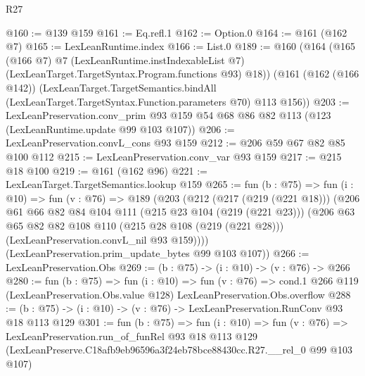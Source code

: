 \begin{lexlean}{R27}
\begin{coremodule}
@160 := @139 @159
@161 := Eq.refl.{1}
@162 := Option.{0}
@164 := @161 (@162 @7)
@165 := LexLeanRuntime.index
@166 := List.{0}
@189 := @160
    (@164
      (@165
        (@166 @7)
        @7
        (LexLeanRuntime.instIndexableList @7)
        (LexLeanTarget.TargetSyntax.Program.functions @93)
        @18))
    (@161
      (@162 (@166 @142))
      (LexLeanTarget.TargetSemantics.bindAll
        (LexLeanTarget.TargetSyntax.Function.parameters @70)
        @113
        @156))
@203 := LexLeanPreservation.conv_prim
    @93
    @159
    @54
    @68
    @86
    @82
    @113
    (@123 (LexLeanRuntime.update @99 @103 @107))
@206 := LexLeanPreservation.convL_cons @93 @159
@212 := @206 @59 @67 @82 @85 @100 @112
@215 := LexLeanPreservation.conv_var @93 @159
@217 := @215 @18 @100
@219 := @161 (@162 @96)
@221 := LexLeanTarget.TargetSemantics.lookup @159
@265 := fun (b : @75) =>
  fun (i : @10) =>
  fun (v : @76) =>
  @189
    (@203
      (@212
        (@217 (@219 (@221 @18)))
        (@206
          @61
          @66
          @82
          @84
          @104
          @111
          (@215 @23 @104 (@219 (@221 @23)))
          (@206
            @63
            @65
            @82
            @82
            @108
            @110
            (@215 @28 @108 (@219 (@221 @28)))
            (LexLeanPreservation.convL_nil @93 @159))))
      (LexLeanPreservation.prim_update_bytes @99 @103 @107))
@266 := LexLeanPreservation.Obs
@269 := (b : @75) -> (i : @10) -> (v : @76) -> @266
@280 := fun (b : @75) =>
  fun (i : @10) =>
  fun (v : @76) =>
  cond.{1} @266 @119 (LexLeanPreservation.Obs.value @128) LexLeanPreservation.Obs.overflow
@288 := (b : @75) -> (i : @10) -> (v : @76) -> LexLeanPreservation.RunConv @93 @18 @113 @129
@301 := fun (b : @75) =>
  fun (i : @10) =>
  fun (v : @76) =>
  LexLeanPreservation.run_of_funRel
    @93
    @18
    @113
    @129
    (LexLeanPreserve.C18afb9eb96596a3f24eb78bce88430cc.R27.__rel_0 @99 @103 @107)
\end{coremodule}
\end{lexlean}
